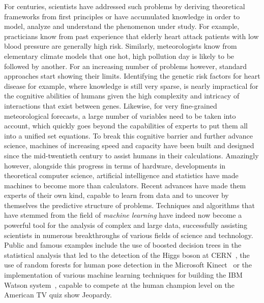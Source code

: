 For centuries, scientists have addressed such problems by deriving
theoretical frameworks from first principles or have accumulated knowledge in
order to model, analyze and understand the pheno\-menon under study. For
example, practicians know from past experience that elderly heart attack
patients with low blood pressure are generally high risk. Similarly,
meteorologists know from elementary climate models that one hot, high pollution
day is likely to be followed by another. For an increasing number of problems
however, standard approaches start showing their limits. Identifying the
genetic risk factors for heart disease for example, where knowledge is still
very sparse, is nearly impractical for the cognitive abilities of humans given
the high complexity and intricacy of interactions that exist between genes.
Likewise, for very fine-grained meteorological forecasts, a large number of
variables need to be taken into account, which quickly goes beyond the
capabilities of experts to put them all into a unified set equations. To break
this cognitive barrier and further advance science, machines of increasing
speed and capacity have been built and designed since the mid-twentieth century
to assist humans in their calculations. Amazingly however, alongside this progress in
terms of hardware, developments in theoretical computer science, artificial
intelligence and statistics have made machines to become more than calculators.
Recent advances have made them experts of their own kind, capable to learn from
data and to uncover by themselves the predictive structure of problems.
Techniques and algorithms that have stemmed from the field of {\it machine
learning} have indeed now become a powerful tool for the analysis of complex and large
data, successfully assisting scientists in numerous breakthroughs of various
fields of science and technology. Public and famous examples include the use
of boosted decision trees in the statistical analysis that led to the detection
of the Higgs boson at CERN~\citep{chatrchyan:2012}, the use of random forests
for human pose detection in the Microsoft Kinect~\citep{criminisi:2013} or
the implementation of various machine learning techniques for building
the IBM Watson system~\citep{ferrucci:2010}, capable to compete at the human
champion level on the American TV quiz show Jeopardy.

